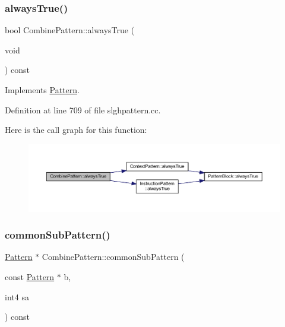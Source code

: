 \subsubsection{\texorpdfstring{alwaysTrue()}{alwaysTrue()}}
{\footnotesize\ttfamily bool Combine\+Pattern\+::always\+True (\begin{DoxyParamCaption}\item[{void}]{ }\end{DoxyParamCaption}) const\hspace{0.3cm}{\ttfamily [virtual]}}



Implements \mbox{\hyperlink{class_pattern_ab1527189c63b797a70c23047c033d35f}{Pattern}}.



Definition at line 709 of file slghpattern.\+cc.

Here is the call graph for this function\+:
\nopagebreak
\begin{figure}[H]
\begin{center}
\leavevmode
\includegraphics[width=350pt]{class_combine_pattern_a2652d809e93e0410daebf2921ad9e04e_cgraph}
\end{center}
\end{figure}
\mbox{\label{class_combine_pattern_a161632a4352aed9b12d9a7497d8af681}} 
\subsubsection{\texorpdfstring{commonSubPattern()}{commonSubPattern()}}
{\footnotesize\ttfamily \mbox{\hyperlink{class_pattern}{Pattern}} $\ast$ Combine\+Pattern\+::common\+Sub\+Pattern (\begin{DoxyParamCaption}\item[{const \mbox{\hyperlink{class_pattern}{Pattern}} $\ast$}]{b,  }\item[{int4}]{sa }\end{DoxyParamCaption}) const\hspace{0.3cm}{\ttfamily [virtual]}}



